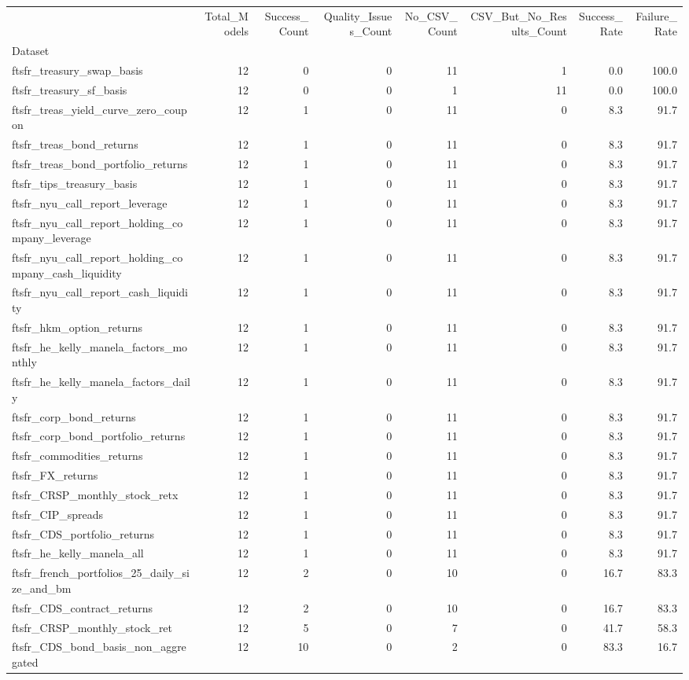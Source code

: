 \begin{tabular}{lrrrrrrr}
\toprule
 & Total_Models & Success_Count & Quality_Issues_Count & No_CSV_Count & CSV_But_No_Results_Count & Success_Rate & Failure_Rate \\
Dataset &  &  &  &  &  &  &  \\
\midrule
ftsfr_treasury_swap_basis & 12 & 0 & 0 & 11 & 1 & 0.0 & 100.0 \\
ftsfr_treasury_sf_basis & 12 & 0 & 0 & 1 & 11 & 0.0 & 100.0 \\
ftsfr_treas_yield_curve_zero_coupon & 12 & 1 & 0 & 11 & 0 & 8.3 & 91.7 \\
ftsfr_treas_bond_returns & 12 & 1 & 0 & 11 & 0 & 8.3 & 91.7 \\
ftsfr_treas_bond_portfolio_returns & 12 & 1 & 0 & 11 & 0 & 8.3 & 91.7 \\
ftsfr_tips_treasury_basis & 12 & 1 & 0 & 11 & 0 & 8.3 & 91.7 \\
ftsfr_nyu_call_report_leverage & 12 & 1 & 0 & 11 & 0 & 8.3 & 91.7 \\
ftsfr_nyu_call_report_holding_company_leverage & 12 & 1 & 0 & 11 & 0 & 8.3 & 91.7 \\
ftsfr_nyu_call_report_holding_company_cash_liquidity & 12 & 1 & 0 & 11 & 0 & 8.3 & 91.7 \\
ftsfr_nyu_call_report_cash_liquidity & 12 & 1 & 0 & 11 & 0 & 8.3 & 91.7 \\
ftsfr_hkm_option_returns & 12 & 1 & 0 & 11 & 0 & 8.3 & 91.7 \\
ftsfr_he_kelly_manela_factors_monthly & 12 & 1 & 0 & 11 & 0 & 8.3 & 91.7 \\
ftsfr_he_kelly_manela_factors_daily & 12 & 1 & 0 & 11 & 0 & 8.3 & 91.7 \\
ftsfr_corp_bond_returns & 12 & 1 & 0 & 11 & 0 & 8.3 & 91.7 \\
ftsfr_corp_bond_portfolio_returns & 12 & 1 & 0 & 11 & 0 & 8.3 & 91.7 \\
ftsfr_commodities_returns & 12 & 1 & 0 & 11 & 0 & 8.3 & 91.7 \\
ftsfr_FX_returns & 12 & 1 & 0 & 11 & 0 & 8.3 & 91.7 \\
ftsfr_CRSP_monthly_stock_retx & 12 & 1 & 0 & 11 & 0 & 8.3 & 91.7 \\
ftsfr_CIP_spreads & 12 & 1 & 0 & 11 & 0 & 8.3 & 91.7 \\
ftsfr_CDS_portfolio_returns & 12 & 1 & 0 & 11 & 0 & 8.3 & 91.7 \\
ftsfr_he_kelly_manela_all & 12 & 1 & 0 & 11 & 0 & 8.3 & 91.7 \\
ftsfr_french_portfolios_25_daily_size_and_bm & 12 & 2 & 0 & 10 & 0 & 16.7 & 83.3 \\
ftsfr_CDS_contract_returns & 12 & 2 & 0 & 10 & 0 & 16.7 & 83.3 \\
ftsfr_CRSP_monthly_stock_ret & 12 & 5 & 0 & 7 & 0 & 41.7 & 58.3 \\
ftsfr_CDS_bond_basis_non_aggregated & 12 & 10 & 0 & 2 & 0 & 83.3 & 16.7 \\
\bottomrule
\end{tabular}